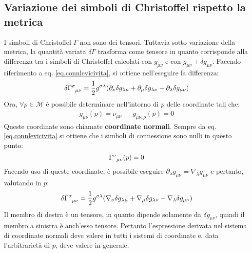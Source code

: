\subsection{Variazione dei simboli di Christoffel rispetto la metrica}\label{para.variaz_connessione}
I simboli di Christoffel $\Gamma$ non sono dei tensori. Tuttavia sotto variazione della metrica, la quantità variata $\delta \Gamma$ trasforma come tensore in quanto corrisponde alla differenza tra i simboli di Christoffel calcolati con $g_{\mu\nu}$ e con $g_{\mu\nu} + \delta g_{\mu\nu}$. Facendo riferimento a eq. \ref{eq.connlevicivita}, si ottiene nell'eseguire la differenza:
\begin{equation*}
    \delta\tensor{\Gamma}{^\sigma_{\mu\nu}} = \frac{1}{2} g^{\sigma\lambda} (\partial_\nu \delta g_{\lambda \mu} + \partial_\mu \delta g_{\lambda \nu} - \partial_\lambda \delta g_{\mu \nu} )
\end{equation*}
Ora, $\forall p \in \mathcal{M}$ è possibile determinare nell'intorno di $p$ delle coordinate tali che:
\begin{align*}
    g_{\mu\nu}(p) = \nu_{\mu\nu} && g_{\mu\nu,\rho}(p) = 0
\end{align*}
Queste coordinate sono chiamate \textbf{coordinate normali}. Sempre da eq. \ref{eq.connlevicivita} si ottiene che i simboli di connessione sono nulli in questo punto:
\begin{equation*}
    \tensor{\Gamma}{^\sigma_{\mu\nu}} (p) = 0
\end{equation*}
Facendo uso di queste coordinate,  è possibile eseguire $\partial_\lambda g_{\mu\nu} = \nabla_\lambda g_{\mu\nu}$ e pertanto, valutando in $p$:
\begin{equation*}
    \delta\tensor{\Gamma}{^\sigma_{\mu\nu}} = \frac{1}{2} g^{\sigma\lambda} (\nabla_\nu \delta g_{\lambda \mu} + \nabla_\mu \delta g_{\lambda \nu} - \nabla_\lambda \delta g_{\mu \nu} )
\end{equation*}
Il membro di destra è un tensore, in quanto dipende solamente da $\delta g_{\mu\nu}$, quindi il membro a sinistra è anch'esso tensore. Pertanto l'espressione derivata nel sistema di coordinate normali deve valere in tutti i sistemi di coordinate e, data l'arbitrarietà di $p$, deve valere in generale.

